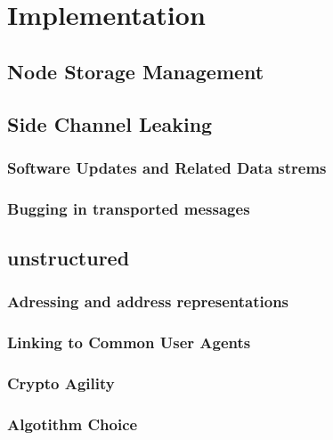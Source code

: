 
\part{Implementation}

\chapter{Node Storage Management}

\chapter{Side Channel Leaking}
\section{Software Updates and Related Data strems}
\section{Bugging in transported messages}

\chapter{unstructured}
\section{Adressing and address representations}
\section{Linking to Common User Agents}
\section{Crypto Agility}


\section{Algotithm Choice}